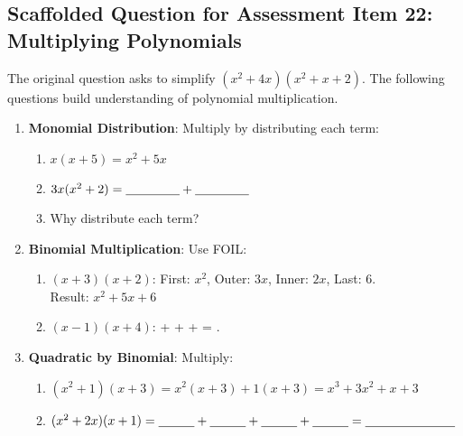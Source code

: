 \documentclass[12pt]{article}
\begin{document}
\subsection*{Scaffolded Question for Assessment Item 22: Multiplying Polynomials}
The original question asks to simplify \( (x^2 + 4x)(x^2 + x + 2) \). The following questions build understanding of polynomial multiplication.

\begin{enumerate}[label=22.\arabic*]
    \item \textbf{Monomial Distribution}: Multiply by distributing each term:
    \begin{enumerate}[label=\alph*)]
        \item \( x(x + 5) = x^2 + 5x \)
        \item \( 3x(x^2 + 2) = \underline{\hspace{1.5cm}} + \underline{\hspace{1.5cm}} \)
        \item Why distribute each term? \underline{\hspace{6cm}}
    \end{enumerate}
    \item \textbf{Binomial Multiplication}: Use FOIL:
    \begin{enumerate}[label=\alph*)]
        \item \( (x + 3)(x + 2) \): First: \( x^2 \), Outer: \( 3x \), Inner: \( 2x \), Last: 6. \\
        Result: \( x^2 + 5x + 6 \)
        \item \( (x - 1)(x + 4) \): \underline{\hspace{1cm}} + \underline{\hspace{1cm}} + \underline{\hspace{1cm}} + \underline{\hspace{1cm}} = \underline{\hspace{2.5cm}}.
    \end{enumerate}
    \item \textbf{Quadratic by Binomial}: Multiply:
    \begin{enumerate}[label=\alph*)]
        \item \( (x^2 + 1)(x + 3) = x^2(x + 3) + 1(x + 3) = x^3 + 3x^2 + x + 3 \)
        \item \( (x^2 + 2x)(x + 1) = \underline{\hspace{1cm}} + \underline{\hspace{1cm}} + \underline{\hspace{1cm}} + \underline{\hspace{1cm}} = \underline{\hspace{2.5cm}} \)

\end{enumerate}
\end{enumerate}
\end{document}
